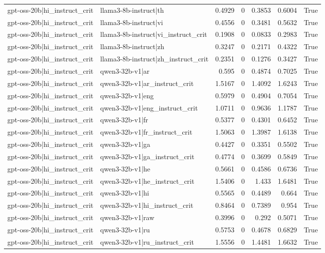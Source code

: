 \begin{table}
\begin{tabular}{l l r r r r l}
gpt-oss-20b|hi_instruct_crit & llama3-8b-instruct|th & 0.4929 & 0 & 0.3853 & 0.6004 & True \\
gpt-oss-20b|hi_instruct_crit & llama3-8b-instruct|vi & 0.4556 & 0 & 0.3481 & 0.5632 & True \\
gpt-oss-20b|hi_instruct_crit & llama3-8b-instruct|vi_instruct_crit & 0.1908 & 0 & 0.0833 & 0.2983 & True \\
gpt-oss-20b|hi_instruct_crit & llama3-8b-instruct|zh & 0.3247 & 0 & 0.2171 & 0.4322 & True \\
gpt-oss-20b|hi_instruct_crit & llama3-8b-instruct|zh_instruct_crit & 0.2351 & 0 & 0.1276 & 0.3427 & True \\
gpt-oss-20b|hi_instruct_crit & qwen3-32b-v1|ar & 0.595 & 0 & 0.4874 & 0.7025 & True \\
gpt-oss-20b|hi_instruct_crit & qwen3-32b-v1|ar_instruct_crit & 1.5167 & 0 & 1.4092 & 1.6243 & True \\
gpt-oss-20b|hi_instruct_crit & qwen3-32b-v1|eng & 0.5979 & 0 & 0.4904 & 0.7054 & True \\
gpt-oss-20b|hi_instruct_crit & qwen3-32b-v1|eng_instruct_crit & 1.0711 & 0 & 0.9636 & 1.1787 & True \\
gpt-oss-20b|hi_instruct_crit & qwen3-32b-v1|fr & 0.5377 & 0 & 0.4301 & 0.6452 & True \\
gpt-oss-20b|hi_instruct_crit & qwen3-32b-v1|fr_instruct_crit & 1.5063 & 0 & 1.3987 & 1.6138 & True \\
gpt-oss-20b|hi_instruct_crit & qwen3-32b-v1|ga & 0.4427 & 0 & 0.3351 & 0.5502 & True \\
gpt-oss-20b|hi_instruct_crit & qwen3-32b-v1|ga_instruct_crit & 0.4774 & 0 & 0.3699 & 0.5849 & True \\
gpt-oss-20b|hi_instruct_crit & qwen3-32b-v1|he & 0.5661 & 0 & 0.4586 & 0.6736 & True \\
gpt-oss-20b|hi_instruct_crit & qwen3-32b-v1|he_instruct_crit & 1.5406 & 0 & 1.433 & 1.6481 & True \\
gpt-oss-20b|hi_instruct_crit & qwen3-32b-v1|hi & 0.5565 & 0 & 0.4489 & 0.664 & True \\
gpt-oss-20b|hi_instruct_crit & qwen3-32b-v1|hi_instruct_crit & 0.8464 & 0 & 0.7389 & 0.954 & True \\
gpt-oss-20b|hi_instruct_crit & qwen3-32b-v1|raw & 0.3996 & 0 & 0.292 & 0.5071 & True \\
gpt-oss-20b|hi_instruct_crit & qwen3-32b-v1|ru & 0.5753 & 0 & 0.4678 & 0.6829 & True \\
gpt-oss-20b|hi_instruct_crit & qwen3-32b-v1|ru_instruct_crit & 1.5556 & 0 & 1.4481 & 1.6632 & True \\

\end{tabular}
\end{table}
